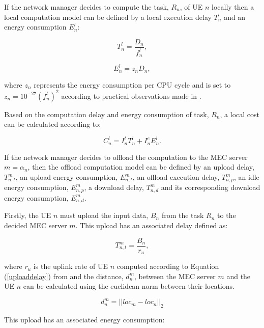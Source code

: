 If the network manager decides to compute the task, $R_n$, of \acrshort{UE} $n$ locally then a local computation model can be defined by a local execution delay $T_n^l$ and an energy consumption $E_n^l$:

\begin{equation}
    T_n^l = \frac{D_n}{f_n^l},
\end{equation}

\begin{equation}
    E_n^l = z_n D_n,
\end{equation}

where $z_n$ represents the energy consumption per \acrshort{CPU} cycle and is set to $z_n = 10^{-27}(f_n^l)^2$ according to practical observations made in \cite{energycons}.

Based on the computation delay and energy consumption of task, $R_n$, a local cost can be calculated according to:

\begin{equation}\label{localCost}
    C_n^l = I_n^t T_n^l + I_n^e E_n^l .
\end{equation}

If the network manager decides to offload the computation to the \acrshort{MEC} server $m = \alpha_n$, then the offload computation model can be defined by an upload delay, $T_{n,t}^m$, an upload energy consumption, $E_{n,t}^m$, an offload execution delay, $T_{n,p}^m$, an idle energy consumption, $E_{n,p}^m$, a download delay, $T_{n,d}^m$ and its corresponding download energy consumption, $E_{n,d}^m$.

Firstly, the \acrshort{UE} $n$ must upload the input data, $B_n$ from the task $R_n$ to the decided \acrshort{MEC} server $m$. This upload has an associated delay defined as:

\begin{equation} \label{transmission_delay}
    T_{n,t}^m = \frac{B_n}{r_u},
\end{equation}

where $r_u$ is the uplink rate of \acrshort{UE} $n$ computed according to Equation (\ref{uploaddelay}) from \cite{taskclass1} and the distance, $d_n^m$, between the \acrshort{MEC} server $m$ and the \acrshort{UE} $n$ can be calculated using the euclidean norm between their locations.

\begin{equation} \label{distance_nm}
    d_n^m = ||loc_m - loc_n||_2
\end{equation}

This upload has an associated energy consumption:

